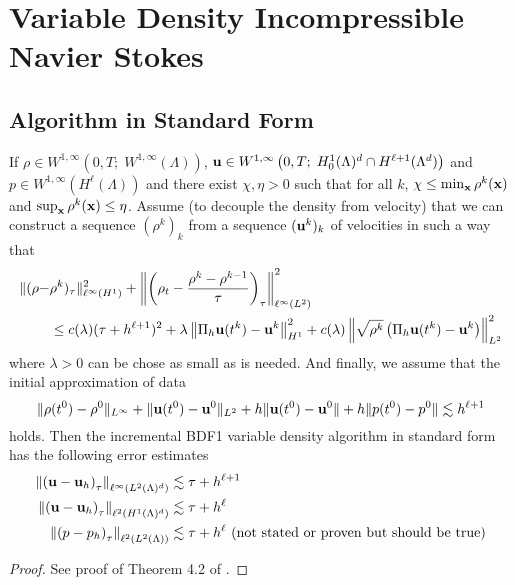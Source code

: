 \documentclass[letterpaper]{erdc}
\begin{document}
%
%
%
\section{Variable Density Incompressible Navier Stokes}

%
%
\subsection{Algorithm in Standard Form}

\begin{theorem}\label{thm:vardensityStandardFormBDF1}
If $\rho \in W^{1,\infty}\left(0,T; \; W^{1,\infty}(\Lambda) \right)$, $\textbf{u} \in W^{1,\infty}\left(0,T;\; H^1_0(\Lambda)^d\cap H^{\ell+1}(\Lambda^d) \right)$ and $p\in W^{1,\infty}\left( H^{\ell}(\Lambda)\right)$ and there exist $\chi, \eta >0 $ such that for all $k$, $\chi \leq \min_{\textbf{x}} \rho^k(\textbf{x})$ and $\sup_{\textbf{x}} \rho^k(\textbf{x}) \leq \eta$. Assume (to decouple the density from velocity) that we can construct a sequence $(\rho^k)_k$ from a sequence $(\textbf{u}^k)_k$ of velocities in such a way that
\begin{align}
  \|(\rho - &\rho^k)_{\tau}\|^2_{\ell^{\infty}(H^1)} + \left\| \left( \rho_t - \frac{\rho^k - \rho^{k-1}}{\tau} \right)_{\tau} \right\|^2_{\ell^{\infty}(L^2)}\\
  &\leq c(\lambda)(\tau + h^{\ell+1})^2 + \lambda \left\| \Pi_h\textbf{u}(t^k) - \textbf{u}^k  \right\|^2_{H^1} + c(\lambda)\left\|\sqrt{\rho^k} \left(\Pi_h\textbf{u}(t^k) - \textbf{u}^k\right)\right\|^2_{L^2}
  \end{align}
  where $\lambda>0$ can be chose as small as is needed. And finally, we assume that the initial approximation of data 
  \begin{equation}
    \|\rho(t^0) - \rho^0\|_{L^{\infty}} + \|\textbf{u}(t^0)-\textbf{u}^{0}\|_{L^2} + h\|\textbf{u}(t^0) - \textbf{u}^0\| + h\|p(t^0) - p^0\| \lesssim h^{\ell+1}
  \end{equation}
  holds.  Then the incremental BDF1 variable density algorithm in standard form has the following error estimates
  \begin{align}
    \left\|\left(\textbf{u} - \textbf{u}_h\right)_{\tau}\right\|_{\ell^{\infty}(L^2(\Lambda)^d)} &\lesssim \tau + h^{\ell+1}\\
    \left\|\left(\textbf{u} - \textbf{u}_h\right)_{\tau}\right\|_{\ell^{2}(H^1(\Lambda)^d)} &\lesssim \tau + h^{\ell}\\
    \left\|\left(p - p_h\right)_{\tau}\right\|_{\ell^{2}(L^2(\Lambda))} & \lesssim \tau + h^{\ell}  \mbox{  (not stated or proven but should be true)}
  \end{align}
\end{theorem}
\begin{proof}
  See proof of Theorem 4.2 of \cite{guermond2011error}.
\end{proof}
\end{document}
